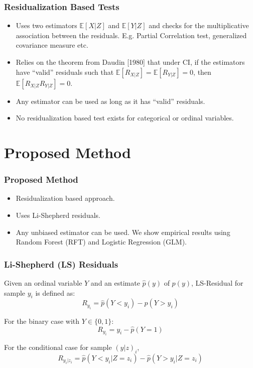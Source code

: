 \documentclass{beamer}
\begin{document}
\begin{frame}
	\frametitle{Residualization Based Tests}
	\begin{itemize}
		\setlength\itemsep{1em}
		\item Uses two estimators $ \mathbb{E}[X| Z] $ and $
			\mathbb{E}[Y | Z] $ and checks for the multiplicative
			association between the residuals. E.g.
			Partial Correlation test, generalized covariance measure etc.
		\item Relies on the theorem from Daudin [1980] \footnotemark 
			that under CI, if the estimators have ``valid'' residuals
			such that $ \mathbb{E}[R_{X|Z}] = \mathbb{E}[R_{Y|Z}] = 0 $,
			then $ \mathbb{E}[R_{X|Z} R_{Y|Z}] = 0 $.
		\item Any estimator can be used as long as it has ``valid'' residuals.
		\item No residualization based test exists for categorical or ordinal variables.
	\end{itemize}
\end{frame}

\section{Proposed Method}
\begin{frame}
	\frametitle{Proposed Method}
	\begin{itemize}
		\setlength\itemsep{1em}
		\item Residualization based approach.
		\item Uses Li-Shepherd residuals.
		\item Any unbiased estimator can be used. We show empirical results using Random Forest (RFT) and Logistic Regression (GLM).
	\end{itemize}
\end{frame}

\begin{frame}
	\frametitle{Li-Shepherd (LS) Residuals}
	Given an ordinal variable $ Y $ and an estimate $ \hat{p}(y) $ of $
	p(y) $, LS-Residual for sample $ y_i $ is defined as:
	$$ R_{y_i} = \hat{p}(Y < y_i) - \hat{p}(Y > y_i) $$
	\vspace{1em}

	For the binary case with $ Y \in \{0, 1\} $:
	$$ R_{y_i} = y_i - \hat{p}(Y = 1) $$
	\vspace{1em}

	For the conditional case for sample $ (y|z)_i $,
	$$ R_{y_i | z_i} = \hat{p}(Y < y_i | Z=z_i) - \hat{p}(Y>y_i|Z=z_i) $$

\end{frame}
\end{document}
